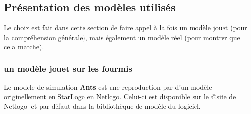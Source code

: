 





%

%


\subsection{Présentation des modèles utilisés}

Le choix est fait dans cette section de faire appel à la fois un modèle jouet (pour la compréhension générale), mais également un modèle réel (pour montrer que cela marche).

\subsubsection{un modèle jouet sur les fourmis}

Le modèle de simulation \textbf{Ants} est une reproduction par \textcite{Wilensky1997} d'un modèle originellement en StarLogo en Netlogo. Celui-ci est disponible sur le \href{http://ccl.northwestern.edu/netlogo/models/Ants}{@site} de Netlogo, et par défaut dans la bibliothèque de modèle du logiciel.

